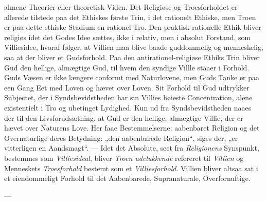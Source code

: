 \documentclass[12pt,a4paper]{book}
\begin{document}
almene Theorier eller theoretisk Viden. Det Religiøse og Troesforholdet er allerede tilstede
paa det Ethiskes første Trin, i det rationelt Ethiske, men Troen er paa dette ethiske
Stadium en rationel Tro. Den praktisk-rationelle Ethik bliver religiøs idet det Godes Idee
sættes, ikke i relativ, men i absolut Forstand, som Villiesidee, hvoraf følger, at Villien
maa blive baade guddommelig og menneskelig, saa at der bliver et Gudsforhold. Paa den
antirationel-religiøse Ethiks Trin bliver Gud den hellige, almægtige Gud, til hvem den
syndige Villle staaer i Forhold. Guds Væsen er ikke længere conformt med Naturlovene, men
Guds Tanke er paa een Gang Eet med Loven og hævet over Loven. Sit Forhold til Gud udtrykker
Subjectet, der i Syndsbevidstheden har sin Villies høieste Concentration, alene existentielt
i Tro og ubetinget Lydighed. Kun ud fra Syndsbevidstheden naaes der til den Livsforudsætning,
at Gud er den hellige, almægtige Villie, der er hævet over Naturens Love. Her faae
Bestemmelserne: aabenbaret Religion og det Overnaturlige deres Betydning: „den
aabenbarede Religion“, siges der, „er vitterligen en Aandsmagt“. --- Idet det Absolute, seet
fra \emph{Religionens} Synspunkt, bestemmes som \emph{Villiesideal}, bliver \emph{Troen udelukkende} refereret til \emph{Villien} og Menneskets \emph{Troesforhold} bestemt som et \emph{Villiesforhold}.
Villien bliver altsaa sat i et eiendommeligt Forhold til det Aabenbarede, Supranaturale,
Overfornuftige.

\begin{center}---\end{center}
\end{document}
